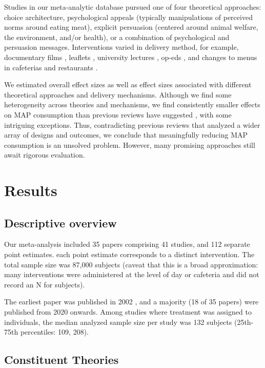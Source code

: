 \documentclass[sn-nature,referee,pdflatex]{sn-jnl}
\begin{document}
Studies in our meta-analytic database pursued one of four theoretical
approaches: choice architecture, psychological appeals (typically
manipulations of perceived norms around eating meat), explicit
persuasion (centered around animal welfare, the environment, and/or
health), or a combination of psychological and persuasion messages.
Interventions varied in delivery method, for example, documentary films
\citep{mathur2021effectiveness}, leaflets \citep{peacock2017},
university lectures \citep{jalil2023}, op-eds \citep{haile2021}, and
changes to menus in cafeterias \citep{andersson2021} and restaurants
\citep{coker2022, sparkman2021}.

We estimated overall effect sizes as well as effect sizes associated
with different theoretical approaches and delivery mechanisms. Although
we find some heterogeneity across theories and mechanisms, we find
consistently smaller effects on MAP consumption than previous reviews
have suggested
\citep{bianchi2018restructuring, byerly2018, chang2023, harguess2020, kwasny2022, mathur2021meta, meier2022},
with some intriguing exceptions. Thus, contradicting previous reviews
that analyzed a wider array of designs and outcomes, we conclude that
meaningfully reducing MAP consumption is an unsolved problem. However,
many promising approaches still await rigorous evaluation.

\section{Results}\label{sec2}

\subsection{Descriptive overview}\label{sec2.1}

Our meta-analysis included 35 papers comprising 41 studies, and 112
separate point estimates. each point estimate corresponds to a distinct
intervention. The total sample size was 87,000 subjects (caveat that
this is a broad approximation: many interventions were administered at
the level of day or cafeteria and did not record an N for subjects).

The earliest paper was published in 2002 \citep{allen2002}, and a
majority (18 of 35 papers) were published from 2020 onwards. Among
studies where treatment was assigned to individuals, the median analyzed
sample size per study was 132 subjects (25th-75th percentiles: 109,
208).

\subsection{Constituent Theories}\label{sec2.2}
\end{document}
